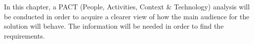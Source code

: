 In this chapter, a PACT (People, Activities, Context \& Technology) analysis will be conducted in order to acquire a clearer view of how the main audience for the solution will behave. The information will be needed in order to find the requirements.